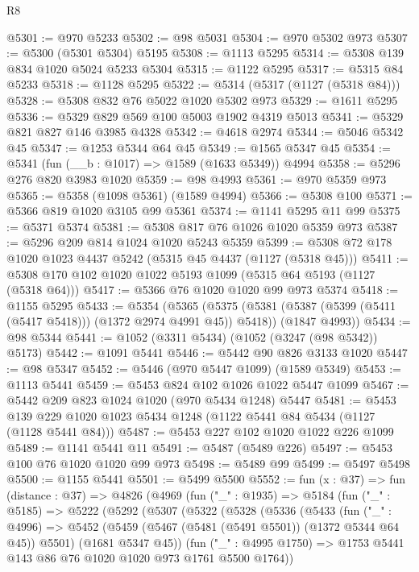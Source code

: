 \begin{lexlean}{R8}
\begin{coremodule}
@5301 := @970 @5233
@5302 := @98 @5031
@5304 := @970 @5302 @973
@5307 := @5300 (@5301 @5304) @5195
@5308 := @1113 @5295
@5314 := @5308 @139 @834 @1020 @5024 @5233 @5304
@5315 := @1122 @5295
@5317 := @5315 @84 @5233
@5318 := @1128 @5295
@5322 := @5314 (@5317 (@1127 (@5318 @84)))
@5328 := @5308 @832 @76 @5022 @1020 @5302 @973
@5329 := @1611 @5295
@5336 := @5329 @829 @569 @100 @5003 @1902 @4319 @5013
@5341 := @5329 @821 @827 @146 @3985 @4328
@5342 := @4618 @2974
@5344 := @5046 @5342 @45
@5347 := @1253 @5344 @64 @45
@5349 := @1565 @5347 @45
@5354 := @5341 (fun (__b : @1017) => @1589 (@1633 @5349)) @4994
@5358 := @5296 @276 @820 @3983 @1020
@5359 := @98 @4993
@5361 := @970 @5359 @973
@5365 := @5358 (@1098 @5361) (@1589 @4994)
@5366 := @5308 @100
@5371 := @5366 @819 @1020 @3105 @99 @5361
@5374 := @1141 @5295 @11 @99
@5375 := @5371 @5374
@5381 := @5308 @817 @76 @1026 @1020 @5359 @973
@5387 := @5296 @209 @814 @1024 @1020 @5243 @5359
@5399 := @5308 @72 @178 @1020 @1023 @4437 @5242 (@5315 @45 @4437 (@1127 (@5318 @45)))
@5411 := @5308 @170 @102 @1020 @1022 @5193 @1099 (@5315 @64 @5193 (@1127 (@5318 @64)))
@5417 := @5366 @76 @1020 @1020 @99 @973 @5374
@5418 := @1155 @5295
@5433 := @5354
    (@5365
      (@5375 (@5381 (@5387 (@5399 (@5411 (@5417 @5418))) (@1372 @2974 @4991 @45)) @5418))
      (@1847 @4993))
@5434 := @98 @5344
@5441 := @1052 (@3311 @5434) (@1052 (@3247 (@98 @5342)) @5173)
@5442 := @1091 @5441
@5446 := @5442 @90 @826 @3133 @1020
@5447 := @98 @5347
@5452 := @5446 (@970 @5447 @1099) (@1589 @5349)
@5453 := @1113 @5441
@5459 := @5453 @824 @102 @1026 @1022 @5447 @1099
@5467 := @5442 @209 @823 @1024 @1020 (@970 @5434 @1248) @5447
@5481 := @5453 @139 @229 @1020 @1023 @5434 @1248 (@1122 @5441 @84 @5434 (@1127 (@1128 @5441 @84)))
@5487 := @5453 @227 @102 @1020 @1022 @226 @1099
@5489 := @1141 @5441 @11
@5491 := @5487 (@5489 @226)
@5497 := @5453 @100 @76 @1020 @1020 @99 @973
@5498 := @5489 @99
@5499 := @5497 @5498
@5500 := @1155 @5441
@5501 := @5499 @5500
@5552 := fun (x : @37) =>
  fun (distance : @37) =>
  @4826
    (@4969
      (fun ("_" : @1935) =>
      @5184
        (fun ("_" : @5185) =>
        @5222
          (@5292
            (@5307
              (@5322
                (@5328
                  (@5336
                    (@5433
                      (fun ("_" : @4996) =>
                      @5452
                        (@5459 (@5467 (@5481 (@5491 @5501)) (@1372 @5344 @64 @45)) @5501)
                        (@1681 @5347 @45))
                      (fun ("_" : @4995 @1750) =>
                      @1753 @5441 @143 @86 @76 @1020 @1020 @973 @1761 @5500 @1764))

\end{coremodule}
\end{lexlean}
